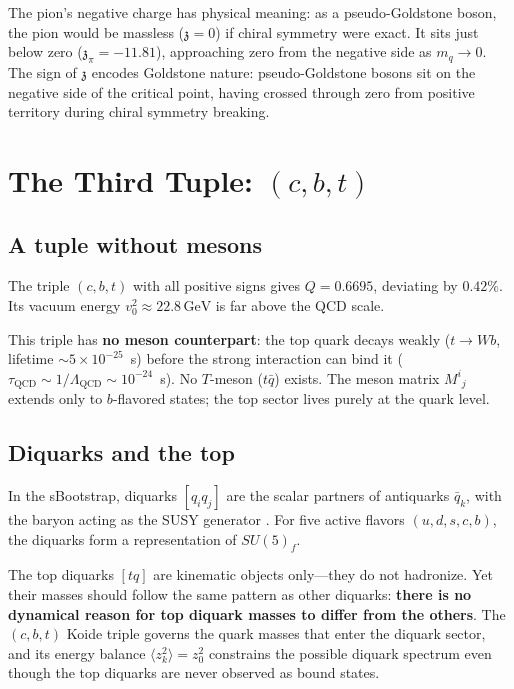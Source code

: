 \documentclass[12pt,a4paper]{article}
\newcommand{\GeV}{\,\text{GeV}}
\newcommand{\zch}{\mathfrak{z}}
\begin{document}
The pion's negative charge has physical meaning: as a pseudo-Goldstone 
boson, the pion would be massless ($\zch = 0$) if chiral symmetry were 
exact. It sits just below zero ($\zch_\pi = -11.81$), approaching zero 
from the negative side as $m_q \to 0$. The sign of $\zch$ encodes 
Goldstone nature: pseudo-Goldstone bosons sit on the negative side 
of the critical point, having crossed through zero from positive 
territory during chiral symmetry breaking.

\section{The Third Tuple: $(c, b, t)$}
\label{sec:cbt}

\subsection{A tuple without mesons}

The triple $(c, b, t)$ with all positive signs gives $Q = 0.6695$, 
deviating by $0.42\%$. Its vacuum energy $v_0^2 \approx 22.8\GeV$ 
is far above the QCD scale.

This triple has \textbf{no meson counterpart}: the top quark decays 
weakly ($t \to Wb$, lifetime $\sim 5 \times 10^{-25}$~s) before the 
strong interaction can bind it ($\tau_{\text{QCD}} \sim 1/\Lambda_{\text{QCD}} 
\sim 10^{-24}$~s). No $T$-meson ($t\bar{q}$) exists. The meson matrix 
$M^i{}_j$ extends only to $b$-flavored states; the top sector lives 
purely at the quark level.

\subsection{Diquarks and the top}

In the sBootstrap, diquarks $[q_i q_j]$ are the scalar partners of 
antiquarks $\bar{q}_k$, with the baryon acting as the SUSY generator 
\cite{CattoGursey, Miyazawa}. For five active flavors 
$(u, d, s, c, b)$, the diquarks form a representation of $SU(5)_f$.

The top diquarks $[tq]$ are kinematic objects only---they do not 
hadronize. Yet their masses should follow the same pattern as other 
diquarks: \textbf{there is no dynamical reason for top diquark masses 
to differ from the others}. The $(c,b,t)$ Koide triple governs the 
quark masses that enter the diquark sector, and its energy balance 
$\langle z_k^2\rangle = z_0^2$ constrains the possible diquark 
spectrum even though the top diquarks are never observed as bound 
states.
\end{document}

